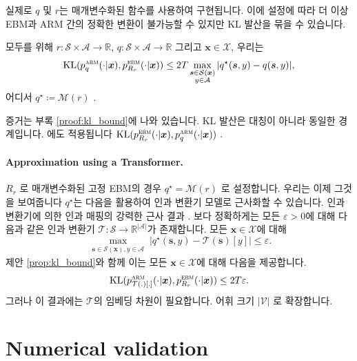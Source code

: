 \documentclass{article}
\def\s{{\bm{s}}}
\def\x{{\bm{x}}}
\def\y{{\bm{y}}}
\def\RR{{\mathbb{R}}}
\def\cA{{\mathcal{A}}}
\def\cM{{\mathcal{M}}}
\def\cS{{\mathcal{S}}}
\def\cT{{\mathcal{T}}}
\def\cX{{\mathcal{X}}}
\newcommand{\Rsub}[1]{R_{#1}}
\def\arm{{\textsc{arm}}}
\def\ebm{{\textsc{ebm}}}
\def\KL{{\mathrm{KL}}}
\def\augvoc{\cA}
\begin{document}
실제로 $q$ 및 $r$는 매개변수화된 함수를 사용하여 구현됩니다.  이에
설정에 따라 더 이상 EBM과 ARM 간의 정확한 변환이 불가능할 수 있지만
KL 발산을 묶을 수 있습니다.
 \begin{proposition} [KL행]
모두를 위해
 $r \colon \cS \times \augvoc \to \RR$,
 $q \colon \cS \times \augvoc \to \RR$ 
그리고
 $\x \in \cX$, 우리는
 \begin{equation} 
 \KL (p^ \arm _q( \cdot | \x ), p^ \ebm _{ \Rsub{r} }( \cdot | \x ))
 \le 2T \max _{ \substack{\s \in \cS(\x)\\y \in \augvoc} } |q^ \star ( \s , y) - q( \s , y)|,
 \end{equation} 
어디서
 $q^\star \coloneqq \cM(r)$ .
 \label{prop:kl_bound} 
 \end{proposition} 
증거는 부록 \ref{proof:kl_bound}에 나와 있습니다.
KL 발산은 대칭이 아니라 동일한 경계입니다. 
에도 적용됩니다
 $\KL(p^\ebm_{\Rsub{r}}(\cdot|\x), p^\arm_q(\cdot|\x))$ .

\paragraph{Approximation using a Transformer.}

$\Rsub{r}$ 로 매개변수화된 고정 EBM의 경우 $q^\star = \cM(r)$ 로 설정합니다.  우리는 이제 그것을 보여줍니다
 $q^\star$는 다음을 활용하여 인과 변환기 모델로 근사화할 수 있습니다.
인과 변환기에 의한 인과 매핑의 강력한 근사 결과
 \citep[Theorem 2]{furuya2024transformers} .  보다 정확하게는 모든 $\varepsilon
> 0$에 대해 다음과 같은 인과 변환기 $\mathcal{T}: \cS \to \RR^{|\augvoc|}$가 존재합니다.
모든 $\x \in \cX$에 대해 
 \begin{equation} 
 \max _{ \substack{\s \in \cS(\x), y \in \augvoc} }|q^ \star ( \s ,y)- \mathcal{T} ( \s )[y]| \leq \varepsilon .
 \end{equation} 
제안 \ref{prop:kl_bound}와 함께 이는 모든 $\x \in \cX$에 대해 다음을 제공합니다.
 \begin{equation} 
 \KL (p^ \arm _{ \mathcal{T} (.)[.]}( \cdot | \x ), p^ \ebm _{ \Rsub{r} }( \cdot | \x ))
 \le 2T \varepsilon .
 \end{equation} 
그러나 이 결과에는 $\cT$의 임베딩 차원이 필요합니다.
어휘 크기 $|\mathcal{V}|$ \citep{furuya2024transformers} 로 확장합니다.

\section{Numerical validation}
\end{document}
